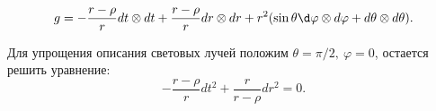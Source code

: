 \begin{to_def}
	\begin{equation*}
		g = - \frac{r - \rho}{r} d t \otimes d t + \frac{r - \rho}{r} d r \otimes d r + r^2(\sin \theta \d \varphi \otimes d \varphi + d \theta \otimes d \theta).
	\end{equation*}
\end{to_def}
Для упрощения описания световых лучей положим $\theta = \pi/2, \ \varphi = 0$, остается решить уравнение:
\begin{equation*}
	-\frac{r - \rho}{r}d t^2 + \frac{r}{r - \rho} d r^2 = 0.
\end{equation*}